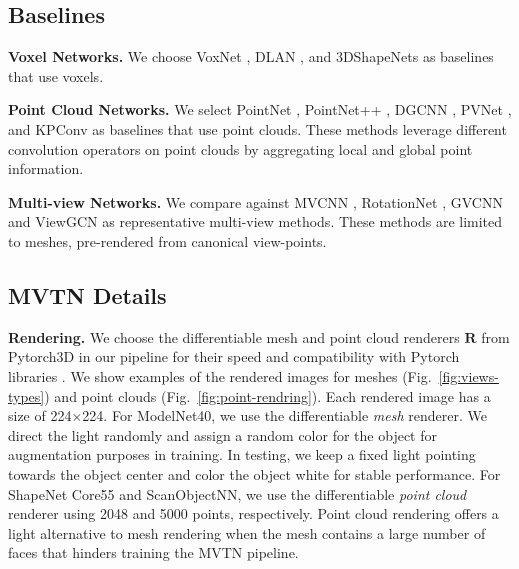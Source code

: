 \documentclass[10pt,twocolumn,letterpaper]{article}
\newcommand{\figLabel}{Fig.~}
\newcommand{\mysection}[1]{\noindent\textbf{#1.}}
\begin{document}
\subsection{Baselines}
\vspace{-4pt}
\mysection{Voxel Networks}
We choose VoxNet \cite{voxnet}, DLAN \cite{dlanretr}, and 3DShapeNets \cite{modelnet} as baselines that use voxels.

\mysection{Point Cloud Networks}
We select PointNet \cite{pointnet}, PointNet++ \cite{pointnet++}, DGCNN \cite{dgcn}, PVNet \cite{pvnet}, and KPConv \cite{kpconv} as baselines that use point clouds.
These methods leverage different convolution operators on point clouds by aggregating local and global point information.

\mysection{Multi-view Networks}
We compare against MVCNN \cite{mvcnn}, RotationNet \cite{mvrotationnet}, GVCNN \cite{mvgvcnn} and ViewGCN \cite{mvviewgcn} as representative multi-view methods.
These methods are limited to meshes, pre-rendered from canonical view-points.
 \subsection{MVTN Details}
\vspace{-4pt}
\mysection{Rendering}
We choose the differentiable mesh and point cloud renderers $\mathbf{R}$ from Pytorch3D \cite{pytorch3d} in our pipeline for their speed and compatibility with Pytorch libraries \cite{paszke2017pytorch}. We show examples of the rendered images for meshes (\figLabel{\ref{fig:views-types}}) and point clouds (\figLabel{\ref{fig:point-rendring}}).
Each rendered image has a size of 224$\times$224. 
For ModelNet40, we use the differentiable \textit{mesh} renderer. We direct the light randomly and assign a random color for the object for augmentation purposes in training. In testing, we keep a fixed light pointing towards the object center and color the object white for stable performance. For ShapeNet Core55 and ScanObjectNN, we use the differentiable \textit{point cloud} renderer using 2048 and 5000 points, respectively. Point cloud rendering offers a light alternative to mesh rendering when the mesh contains a large number of faces that hinders training the MVTN pipeline.
\end{document}
